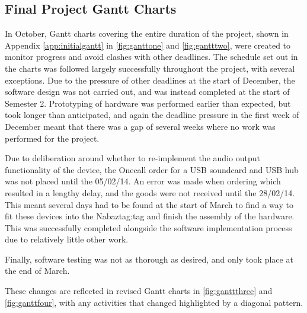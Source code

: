 \documentclass[12pt, a4paper]{article}
\begin{document}
				\vspace{-30pt}
			
		\subsection{Final Project Gantt Charts}
			In October, Gantt charts covering the entire duration of the project, shown in Appendix \ref{app:initialgantt} in \autoref{fig:ganttone} and \autoref{fig:gantttwo}, were created to monitor progress and avoid clashes with other deadlines. The schedule set out in the charts was followed largely successfully throughout the project, with several exceptions. Due to the pressure of other deadlines at the start of December, the software design was not carried out, and was instead completed at the start of Semester 2. Prototyping of hardware was performed earlier than expected, but took longer than anticipated, and again the deadline pressure in the first week of December meant that there was a gap of several weeks where no work was performed for the project.
			
			Due to deliberation around whether to re-implement the audio output functionality of the device, the Onecall order for a \ac{USB} soundcard and \ac{USB} hub was not placed until the 05/02/14. An error was made when ordering which resulted in a lengthy delay, and the goods were not received until the 28/02/14. This meant several days had to be found at the start of March to find a way to fit these devices into the Nabaztag:tag and finish the assembly of the hardware. This was successfully completed alongside the software implementation process due to relatively little other work.
						
			 Finally, software testing was not as thorough as desired, and only took place at the end of March. 
			
		These changes are reflected in revised Gantt charts in \autoref{fig:ganttthree} and \autoref{fig:ganttfour}, with any activities that changed highlighted by a diagonal pattern.
			
\end{document}
